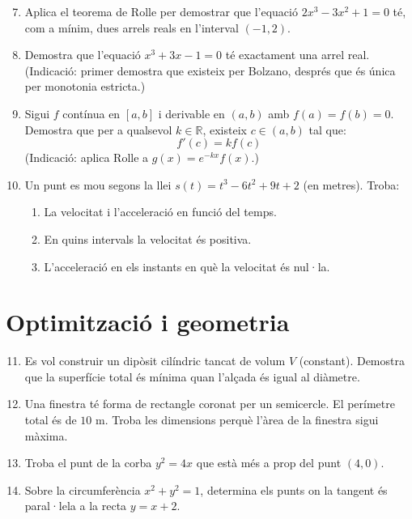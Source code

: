 \documentclass[12pt]{article}
\begin{document}
\begin{enumerate}[label=\arabic*.]
    \setcounter{enumi}{6}
    \item Aplica el teorema de Rolle per demostrar que l'equació $2x^3 - 3x^2 + 1 = 0$ té, com a mínim, dues arrels reals en l'interval $(-1,2)$.

    \item Demostra que l'equació $x^3 + 3x - 1 = 0$ té exactament una arrel real. (Indicació: primer demostra que existeix per Bolzano, després que és única per monotonia estricta.)

    \item Sigui $f$ contínua en $[a,b]$ i derivable en $(a,b)$ amb $f(a)=f(b)=0$. Demostra que per a qualsevol $k \in \mathbb{R}$, existeix $c \in (a,b)$ tal que:
    \[
    f'(c) = k f(c)
    \]
    (Indicació: aplica Rolle a $g(x)=e^{-kx}f(x)$.)

    \item Un punt es mou segons la llei $s(t) = t^3 - 6t^2 + 9t + 2$ (en metres). Troba:
    \begin{enumerate}[label=\alph*)]
        \item La velocitat i l'acceleració en funció del temps.
        \item En quins intervals la velocitat és positiva.
        \item L'acceleració en els instants en què la velocitat és nul·la.
    \end{enumerate}
\end{enumerate}

\section*{Optimització i geometria}

\begin{enumerate}[label=\arabic*.]
    \setcounter{enumi}{10}
    \item Es vol construir un dipòsit cilíndric tancat de volum $V$ (constant). Demostra que la superfície total és mínima quan l'alçada és igual al diàmetre.

    \item Una finestra té forma de rectangle coronat per un semicercle. El perímetre total és de $10$ m. Troba les dimensions perquè l'àrea de la finestra sigui màxima.

    \item Troba el punt de la corba $y^2 = 4x$ que està més a prop del punt $(4,0)$.

    \item Sobre la circumferència $x^2 + y^2 = 1$, determina els punts on la tangent és paral·lela a la recta $y = x + 2$.
\end{enumerate}
\end{document}
